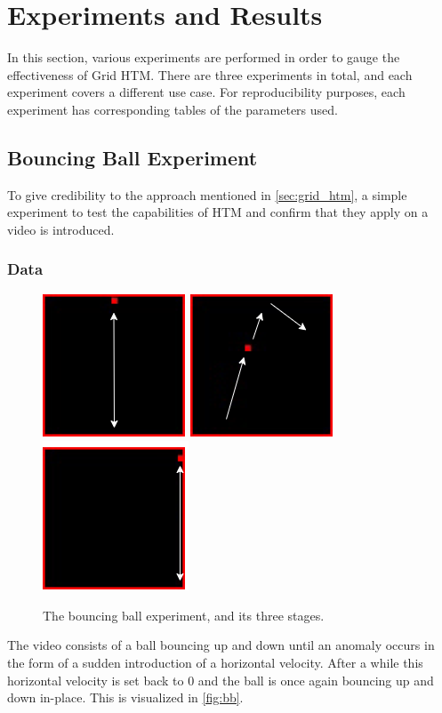 \chapter{Experiments and Results}
\label{sec:experiments}
In this section, various experiments are performed in order to gauge the effectiveness of Grid HTM. There are three experiments in total, and each experiment covers a different use case. For reproducibility purposes, each experiment has corresponding tables of the parameters used.
\section{Bouncing Ball Experiment}
To give credibility to the approach mentioned in \autoref{sec:grid_htm}, a simple experiment to test the capabilities of HTM and confirm that they apply on a video is introduced.
\subsection{Data}
\begin{figure}[H]
    \centering
    \includegraphics[width=.3\textwidth]{resources/experiments/bouncing_ball/bb_updown1.png}\hfill
    \includegraphics[width=.3\textwidth]{resources/experiments/bouncing_ball/bb_updownside.png}\hfill
    \includegraphics[width=.3\textwidth]{resources/experiments/bouncing_ball/bb_updown2.png}
    \caption[Bouncing Ball Experiment]{The bouncing ball experiment, and its three stages.}
    \label{fig:bb}
\end{figure}
The video consists of a ball bouncing up and down until an anomaly occurs in the form of a sudden introduction of a horizontal velocity. After a while this horizontal velocity is set back to 0 and the ball is once again bouncing up and down in-place. This is visualized in \autoref{fig:bb}.
\par

